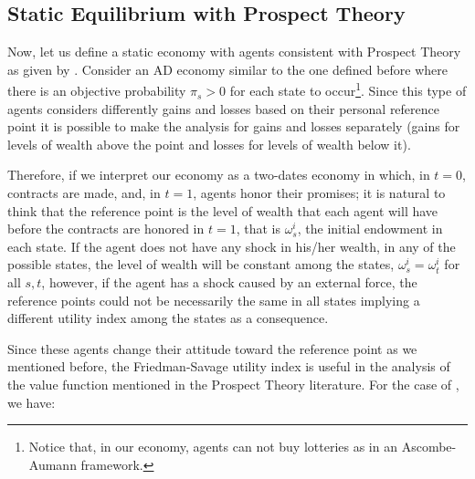 \documentclass[pdftex]{article}
\numberwithin{equation}{section}
\theoremstyle{th}
\newtheorem{proof lemma}{{Proof Lemma}.}
\theoremstyle{definition}
\newtheorem{remark}{Remark}%
\newtheorem*{risk lovers}{Risk lovers}
\newtheorem*{risk averse}{Risk averse}
\begin{document}

\subsection{Static Equilibrium with Prospect Theory}

{Now, let us define a static economy with agents consistent with Prospect Theory as given by \cite{KT92}. Consider an AD economy similar to the one defined before where there is an objective probability $\pi_s>0$ for each state to occur\footnote{Notice that, in our economy, agents can not buy lotteries as in an Ascombe-Aumann framework.}. Since this type of agents considers differently gains and losses based on their personal reference point it is possible to make the analysis for gains and losses separately (gains for levels of wealth above the point and losses for levels of wealth below it).}

{Therefore, if we interpret our economy as a two-dates economy in which, in $t=0$, contracts are made, and, in $t=1$, agents honor their promises; it is natural to think that the reference point is the level of wealth that each agent will have before the contracts are honored in $t=1$, that is $\omega^i_s$, the initial endowment in each state.}
{If the agent does not have any shock in his/her wealth, in any of the possible states, the level of wealth will be constant among the states, $\omega^i_{s}=\omega^i_t$ for all $s,t$, however, if the agent has a shock caused by an external force, the reference points could not be necessarily the same in all states implying a different utility index among the states as a consequence.}

Since these agents change their attitude toward the reference point as we mentioned before, the Friedman-Savage utility index is useful in the analysis of the value function mentioned in the Prospect Theory literature. For the case of \cite{KT92}, we have:
\end{document}

